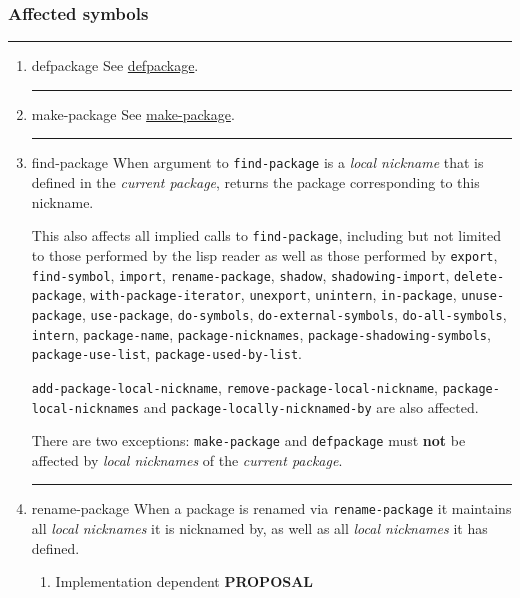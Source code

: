 \documentclass[11pt]{article}
\begin{document}
\subsubsection{Affected symbols}
\label{sec:org42f1690}
\noindent\rule{\textwidth}{0.5pt}
\begin{enumerate}
\item defpackage
\label{sec:orgbb40fb7}
See \hyperref[sec:orgdd4a60d]{defpackage}.

\noindent\rule{\textwidth}{0.5pt}
\item make-package
\label{sec:orgd5ba704}
See \hyperref[sec:orgd0f3176]{make-package}.

\noindent\rule{\textwidth}{0.5pt}
\item find-package
\label{sec:orgbcd3d9b}
When argument to \texttt{find-package} is a \emph{local nickname} that is defined in
the \emph{current package}, returns the package corresponding to this nickname.

This also affects all implied calls to \texttt{find-package}, including but not
limited to those performed by the lisp reader as well as those performed by
\texttt{export}, \texttt{find-symbol}, \texttt{import}, \texttt{rename-package}, \texttt{shadow},
\texttt{shadowing-import}, \texttt{delete-package}, \texttt{with-package-iterator}, \texttt{unexport},
\texttt{unintern}, \texttt{in-package}, \texttt{unuse-package}, \texttt{use-package}, \texttt{do-symbols},
\texttt{do-external-symbols}, \texttt{do-all-symbols}, \texttt{intern}, \texttt{package-name},
\texttt{package-nicknames}, \texttt{package-shadowing-symbols}, \texttt{package-use-list},
\texttt{package-used-by-list}.

\texttt{add-package-local-nickname}, \texttt{remove-package-local-nickname},
\texttt{package-local-nicknames} and \texttt{package-locally-nicknamed-by} are also
affected.

There are two exceptions: \texttt{make-package} and \texttt{defpackage} must \textbf{not} be
affected by \emph{local nicknames} of the \emph{current package}.

\noindent\rule{\textwidth}{0.5pt}
\item rename-package
\label{sec:orgd3b9633}
When a package is renamed via \texttt{rename-package} it maintains all \emph{local
nicknames} it is nicknamed by, as well as all \emph{local nicknames} it has
defined.
\begin{enumerate}
\item Implementation dependent
\label{sec:org27e2a54}
\textbf{PROPOSAL}


\end{enumerate}
\end{enumerate}
\end{document}
